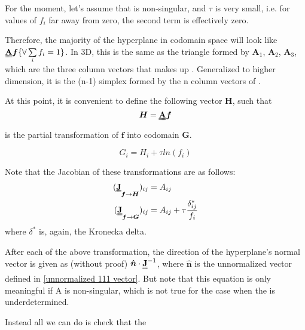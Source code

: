 \documentclass[a4paper, 12pt]{article}
\newcommand{\matr}[1]{\uuline{\bf{#1}}}
\newcommand{\ve}[1]{\boldsymbol{#1}}
\newcommand{\n}[0]{\ve{\hat{n}}}
\begin{document}
\begin{appendices}
For the moment, let's assume that \matr{A} is non-singular, and $\tau$ is very small, i.e. for values of $f_i$ far away from zero, the second term is effectively zero.

Therefore, the majority of the hyperplane in codomain space will look like $\matr{A}\ve{f} \{\forall \sum\limits_i{f_i}=1\}$. In 3D, this is the same as the triangle formed by $\ve{A}_1$, $\ve{A}_2$, $\ve{A}_3$, which are the three column vectors that makes up \matr{A}. Generalized to higher dimension, it is the (n-1) simplex formed by the n column vectors of \matr{A}.

At this point, it is convenient to define the following vector $\ve{H}$, such that
\begin{equation}
    \ve{H}=\matr{A}\ve{f}
\end{equation}
is the partial transformation of $\ve{f}$ into codomain $\ve{G}$. 

\begin{equation}
    G_i=H_i + \tau ln(f_i)
\end{equation}

Note that the Jacobian of these transformations are as follows:
\begin{align}
    (\matr{J}_{\ve{f}\to\ve{H}})_{ij} &= A_{ij}\\
    (\matr{J}_{\ve{f}\to\ve{G}})_{ij} &= A_{ij} + \tau \frac{\delta^*_{ij}}{f_i}
\end{align}
where $\delta^*$ is, again, the Kronecka delta.

After each of the above transformation, the direction of the hyperplane's normal vector is given as (without proof) $\n\cdot\matr{J}^{-1}$, where $\n$ is the unnormalized vector defined in \ref{unnormalized 111 vector}. But note that this equation is only meaningful if A is non-singular, which is not true for the case when the is underdetermined.

Instead all we can do is check that the 



\end{appendices}
\end{document}
